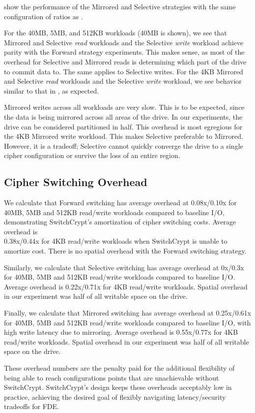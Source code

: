  show the performance of the Mirrored and
Selective strategies with the same configuration of ratios as
.

For the 40MB, 5MB, and 512KB workloads (40MB is shown), we see that Mirrored and
Selective \emph{read} workloads and the Selective \emph{write} workload achieve
parity with the Forward strategy experiments. This makes sense, as most of the
overhead for Selective and Mirrored reads is determining which part of the drive
to commit data to. The same applies to Selective writes. For the 4KB Mirrored
and Selective \emph{read} workloads and the Selective \emph{write} workload, we
see behavior similar to that in , as expected.

Mirrored writes across all workloads are very slow. This is to be expected,
since the data is being mirrored across all areas of the drive. In our
experiments, the drive can be considered partitioned in half. This overhead is
most egregious for the 4KB Mirrored write workload. This makes Selective
preferable to Mirrored. However, it is a tradeoff; Selective cannot quickly
converge the drive to a single cipher configuration or survive the loss of an
entire region.

\subsection{Cipher Switching Overhead} \label{subsec:3}

We calculate that Forward switching has average overhead at 0.08x/0.10x for
40MB, 5MB and 512KB read/write workloads compared to baseline I/O, demonstrating
SwitchCrypt's amortization of cipher switching costs. Average overhead
is\\0.38x/0.44x for 4KB read/write workloads when SwitchCrypt is unable to
amortize cost. There is no spatial overhead with the Forward switching strategy.

Similarly, we calculate that Selective switching has average overhead at 0x/0.3x
for 40MB, 5MB and 512KB read/write workloads compared to baseline I/O. Average
overhead is 0.22x/0.71x for 4KB read/write workloads. Spatial overhead in our
experiment was half of all writable space on the drive.

Finally, we calculate that Mirrored switching has average overhead at
0.25x/0.61x for 40MB, 5MB and 512KB read/write workloads compared to baseline
I/O, with high write latency due to mirroring. Average overhead is 0.55x/0.77x
for 4KB read/write workloads. Spatial overhead in our experiment was half of all
writable space on the drive.

These overhead numbers are the penalty paid for the additional flexibility of
being able to reach configurations points that are unachievable without
SwitchCrypt. SwitchCrypt's design keeps these overheads acceptably low in
practice, achieving the desired goal of flexibly navigating latency/security
tradeoffs for FDE.
